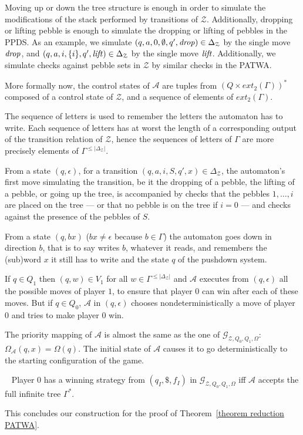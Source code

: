 \documentclass[a4paper,UKenglish,cleveref, autoref, thm-restate]{lipics-v2021}
\renewcommand{\A}{\mathcal{A}}
\begin{document}
Moving up or down the tree structure is enough in order to simulate the modifications of the stack
performed by transitions of $\mathcal{Z}$. Additionally, dropping or lifting pebble is enough to simulate the dropping or lifting of pebbles in the PPDS. As an example, we simulate
$(q, a, 0, \emptyset, q', \text{\textit{drop}})  \in   \Delta_{\mathcal{Z}} $ by the single move $\text{\textit{drop}}$, and
$(q, a, i, \{i\}, q', \text{\textit{lift}})  \in   \Delta_{\mathcal{Z}} $ by the single move 
$\text{\textit{lift}}$. Additionally, we simulate checks against pebble sets in $\mathcal{Z}$ by similar checks in the PATWA.


More formally now, the control states of $\mathcal{A}$ are tuples
from $( Q \times ext_2(\Gamma) )^*$  
composed of a control state of  $\mathcal{Z}$, and
a sequence of elements of $ ext_2(\Gamma)$.

The sequence of letters is used to remember the letters the automaton has to write. 
Each sequence of letters has at worst the length of a corresponding output of the transition relation of $\mathcal{Z}$, hence the sequences of letters of $\Gamma$ are more precisely elements of $\Gamma^{ \leq |\Delta_{\mathcal{Z}}|}$.  


From a state $(q, \epsilon)$, for a transition
$(q, a, i, S, q', x) \in \Delta_{\mathcal{Z}}$,
the automaton's first move simulating the transition, be it the dropping of a pebble, the lifting of a pebble, or going up the tree, is accompanied by 
checks that the pebbles $1, \ldots, i$ are placed on the tree \---- or that no pebble is on the tree if $i=0$ \---- and checks against the presence of the pebbles of $S$.

From a state $(q , bx)$ ($bx \neq \epsilon$ because $b  \in  \Gamma$) the automaton goes down
in direction $b$, that is to say writes $b$, whatever it reads, and remembers the
(sub)word $x$ it still has to write and the state $q$ of the pushdown system. 


If $q  \in  Q_1$ then $ (q,w)  \in  V_1$ for all $w \in \Gamma^{ \leq |\Delta_{\mathcal{Z}}|}$
and
$\mathcal{A}$
executes from $(q,\epsilon)$ all the possible moves of player $1$, to ensure that player $0$ can win after
each of these moves. But if $q  \in  Q_0$, $\mathcal{A}$ in $(q,\epsilon)$ chooses nondeterministically a move of
player $0$ and tries to make player $0$ win. \newline


The priority mapping of $\mathcal{A}$ is almost the same as the one of 
$\mathcal{G}_{\mathcal{Z},Q_0,Q_1,\Omega}$: 
$\Omega_\A(q, x) =
\Omega (q)$. 
The initial state of $\mathcal{A}$ causes it to go deterministically to the starting
configuration of the game.




\begin{lemma}~\label{lemma reduction PATWA}
Player $0$ has a winning strategy from $(q_I, \$, f_I)$ in $\mathcal{G}_{\mathcal{Z},Q_0,Q_1,\Omega}$ iff $\mathcal{A}$ accepts the full
infinite tree $\Gamma^* $.

\end{lemma}


This concludes our construction for the proof of Theorem~\ref{theorem reduction PATWA}.
\end{document}

